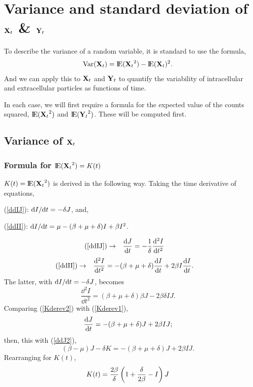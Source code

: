 \section{Variance and standard deviation of ${{\bf X}_t}$ \& ${{\bf Y}_t}$}

To describe the variance of a random variable, it is standard to use the formula, 
\begin{equation*}
\text{Var}({{\bf X}_t}) = {\rm I}\!{\rm E}({{\bf X}_t}^2) - {\rm I}\!{\rm E}({{\bf X}_t})^2.
\end{equation*}
And we can apply this to ${{\bf X}_t}$ and ${{\bf Y}_t}$ to quantify the variability of intracellular and extracellular particles as functions of time. 

In each case, we will first require a formula for the expected value of the counts squared,  ${\rm I}\!{\rm E}({{\bf X}_t}^2)$ and ${\rm I}\!{\rm E}({{\bf Y}_t}^2)$.
These will be computed first.





\subsection{Variance of ${{\bf X}_t}$}

\subsubsection{Formula for ${\rm I}\!{\rm E}({{\bf X}_t}^2) = K(t)$}

$K(t) = {\rm I}\!{\rm E}({{\bf X}_t}^2)$ is derived in the following way. Taking the time derivative of equations,

 (\ref{ddIJ}): ${\rm d}I/{\rm d}t = -\delta J$, and, 
 
 (\ref{ddII}): ${\rm d}I/{\rm d}t = \mu - (\beta + \mu + \delta) I + \beta I^2$.

\begin{align}
\label{Kderev1}
\text{(\ref{ddIJ})}\to&&\displaystyle\frac{{\rm d} J}{{\rm d} t} = -\frac{1}{\delta}\frac{{\rm d}^2 I}{{\rm d} t^2}&&
\end{align}
\begin{align*}
\text{(\ref{ddII})}\to&& \frac{{\rm d}^2 I}{{\rm d} t^2} = -(\beta + \mu + \delta) \displaystyle\frac{{\rm d} I}{{\rm d} t} + 2\beta I \displaystyle\frac{{\rm d} I}{{\rm d} t}.&&
\end{align*}
The latter, with ${\rm d}I/{\rm d}t = -\delta J$, becomes
\begin{equation}
\label{Kderev2}
\frac{\dd^2 I}{\dd t^2} = (\beta + \mu + \delta)\beta J- 2\beta \delta I J.
\end{equation}
Comparing (\ref{Kderev2}) with (\ref{Kderev1}),
\begin{equation*}
\displaystyle\frac{{\rm d} J}{{\rm d} t} = -(\beta + \mu + \delta) J + 2\beta I J;
\end{equation*}
then, this with (\ref{ddJ2}),
$$(\beta - \mu) J - \delta K = -(\beta + \mu + \delta) J + 2\beta I J.$$
Rearranging for $K(t)$,
\begin{equation*}
K(t) = \frac{2\beta}{\delta}\left(1+\frac{\delta}{2\beta} - I\right) J
\end{equation*}




